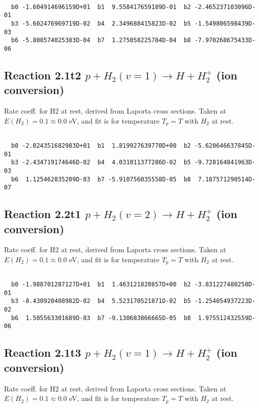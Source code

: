 \begin{small}\begin{verbatim}

  b0 -1.604914696159D+01  b1  9.558417659189D-01  b2 -2.465237103096D-01
  b3 -5.602476969719D-02  b4  2.349688415823D-02  b5 -1.549806598439D-03
  b6 -5.808574025383D-04  b7  1.275058225784D-04  b8 -7.970268675433D-06

\end{verbatim}\end{small}

\newpage
\subsection{
Reaction 2.1t2
$ p + H_2(v=1) \rightarrow H + H_2^+$ (ion conversion)
}
Rate coeff. for H2 at rest, derived from Laporta cross sections.
Taken at $E(H_2) = 0.1 \approx 0.0$ eV,  and fit is for temperature $T_p=T$ with $H_2$ at rest.

\begin{small}\begin{verbatim}

  b0 -2.024351682983D+01  b1  1.819927639770D+00  b2 -5.620646637845D-01
  b3 -2.434719174646D-02  b4  4.031011377286D-02  b5 -9.728164841963D-03
  b6  1.125462835209D-03  b7 -5.910756035558D-05  b8  7.187571290514D-07

\end{verbatim}\end{small}

\newpage
\subsection{
Reaction 2.2t1
$ p + H_2(v=2) \rightarrow H + H_2^+$ (ion conversion)
}
Rate coeff. for H2 at rest, derived from Laporta cross sections.
Taken at $E(H_2) = 0.1 \approx 0.0$ eV,  and fit is for temperature $T_p=T$ with $H_2$ at rest.

\begin{small}\begin{verbatim}

  b0 -1.988701287127D+01  b1  1.463121820857D+00  b2 -3.831227480258D-01
  b3 -8.430920408982D-02  b4  5.523170521871D-02  b5 -1.254054937223D-02
  b6  1.505563301689D-03  b7 -9.130683866665D-05  b8  1.975512432559D-06

\end{verbatim}\end{small}

\newpage
\subsection{
Reaction 2.1t3
$ p + H_2(v=1) \rightarrow H + H_2^+$ (ion conversion)
}
Rate coeff. for H2 at rest, derived from Laporta cross sections.
Taken at $E(H_2) = 0.1 \approx 0.0$ eV,  and fit is for temperature $T_p=T$ with $H_2$ at rest.

